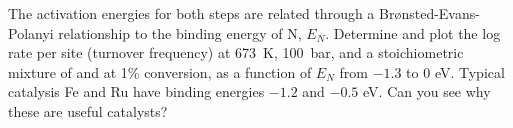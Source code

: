 \documentclass[11pt]{article}
\begin{document}
\noindent The activation energies for both steps are related through a Br\o{}nsted-Evans-Polanyi relationship to the binding energy of N, \(E_N\). Determine and plot the log rate per site (turnover frequency) at \SI{673}{K}, \SI{100}{bar}, and a stoichiometric mixture of  and  at 1\% conversion, as a function of \(E_N\) from \(-1.3\) to \(0\) eV.  Typical catalysis Fe and Ru have binding energies \(-1.2\)  and \(-0.5\) eV.  Can you see why these are useful catalysts?
\end{document}
